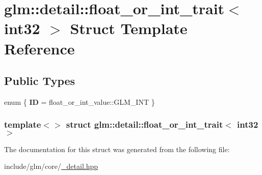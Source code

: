 \hypertarget{structglm_1_1detail_1_1float__or__int__trait_3_01int32_01_4}{\section{glm\-:\-:detail\-:\-:float\-\_\-or\-\_\-int\-\_\-trait$<$ int32 $>$ \-Struct \-Template \-Reference}
\label{structglm_1_1detail_1_1float__or__int__trait_3_01int32_01_4}
}
\subsection*{\-Public \-Types}
\begin{DoxyCompactItemize}
\item 
enum \{ {\bfseries \-I\-D} =  float\-\_\-or\-\_\-int\-\_\-value\-:\-:\-G\-L\-M\-\_\-\-I\-N\-T
 \}
\end{DoxyCompactItemize}
\subsubsection*{template$<$$>$ struct glm\-::detail\-::float\-\_\-or\-\_\-int\-\_\-trait$<$ int32 $>$}



\-The documentation for this struct was generated from the following file\-:\begin{DoxyCompactItemize}
\item 
include/glm/core/\hyperlink{__detail_8hpp}{\-\_\-detail.\-hpp}\end{DoxyCompactItemize}
